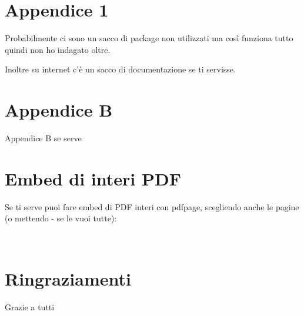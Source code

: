 \documentclass[12pt,a4paper,twoside]{book}
\begin{document}
\renewcommand{\appendixtocname}{Appendici}
\renewcommand{\appendixpagename}{Appendici}
{}
\begin{appendices}
\chapter{Appendice 1}
\label{Appendice:A}
Probabilmente ci sono un sacco di package non utilizzati ma così funziona tutto quindi non ho indagato oltre.

Inoltre su internet c'è un sacco di documentazione se ti servisse.
\chapter{Appendice B}
\label{Appendice:B}
Appendice B se serve

\chapter{Embed di interi PDF}
\label{Appendice:C}
Se ti serve puoi fare embed di PDF interi con pdfpage, scegliendo anche le pagine (o mettendo - se le vuoi tutte):


\end{appendices}

\newpage~\newpage
\chapter*{Ringraziamenti}
Grazie a tutti
\end{document}
